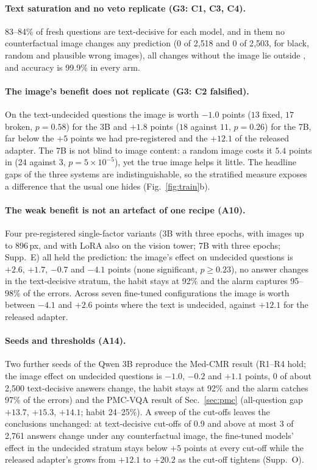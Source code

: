 \paragraph{Text saturation and no veto replicate (G3: C1, C3, C4).}
83--84\% of fresh questions are text-decisive for each model, and in them no counterfactual image changes any prediction (0 of 2{,}518 and 0 of 2{,}503, for black, random and plausible wrong images), all changes without the image lie outside \HI{}, and accuracy is 99.9\% in every arm.

\paragraph{The image's benefit does not replicate (G3: C2 falsified).}
On the text-undecided questions the image is worth $-1.0$ points ($13$ fixed, $17$ broken, $p=0.58$) for the 3B and $+1.8$ points ($18$ against $11$, $p=0.26$) for the 7B, far below the $+5$ points we had pre-registered and the $+12.1$ of the released adapter.
The 7B is not blind to image content: a random image costs it $5.4$ points in \LO{} (24 against 3, $p=5\times10^{-5}$), yet the true image helps it little.
The headline gaps of the three systems are indistinguishable, so the stratified measure exposes a difference that the usual one hides (Fig.~\ref{fig:train}b).

\paragraph{The weak benefit is not an artefact of one recipe (A10).}
Four pre-registered single-factor variants (3B with three epochs, with images up to 896\,px, and with LoRA also on the vision tower; 7B with three epochs; Supp.~E) all held the prediction: the image's effect on undecided questions is $+2.6$, $+1.7$, $-0.7$ and $-4.1$ points (none significant, $p\ge0.23$), no answer changes in the text-decisive stratum, the habit stays at 92\% and the alarm captures 95--98\% of the errors.
Across seven fine-tuned configurations the image is worth between $-4.1$ and $+2.6$ points where the text is undecided, against $+12.1$ for the released adapter.

\paragraph{Seeds and thresholds (A14).}
Two further seeds of the Qwen 3B reproduce the Med-CMR result (R1--R4 hold; the image effect on undecided questions is $-1.0$, $-0.2$ and $+1.1$ points, 0 of about 2{,}500 text-decisive answers change, the habit stays at 92\% and the alarm catches 97\% of the errors) and the PMC-VQA result of Sec.~\ref{sec:pmc} (all-question gap $+13.7$, $+15.3$, $+14.1$; habit 24--25\%).
A sweep of the cut-offs leaves the conclusions unchanged: at text-decisive cut-offs of 0.9 and above at most 3 of 2{,}761 answers change under any counterfactual image, the fine-tuned models' effect in the undecided stratum stays below $+5$ points at every cut-off while the released adapter's grows from $+12.1$ to $+20.2$ as the cut-off tightens (Supp.~O).

